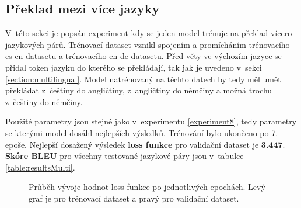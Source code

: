 \subsection{Překlad mezi více jazyky} \label{experimentMultiLingual}
V~této sekci je popsán experiment kdy se jeden model trénuje na překlad vícero jazykových párů. Trénovací dataset vznikl spojením a promícháním trénovacího cs-en datasetu a trénovacího en-de datasetu. Před věty ve výchozím jazyce se přidal token jazyku do kterého se překládají, tak jak je uvedeno v~sekci \ref{section:multilingual}. Model natrénovaný na těchto datech by tedy měl umět překládat z~češtiny do angličtiny, z~angličtiny do němčiny a možná trochu z~češtiny do němčiny.

Použité parametry jsou stejné jako v~experimentu \ref{experiment8}, tedy parametry se kterými model dosáhl nejlepších výsledků. Trénování bylo ukončeno po 7. epoše. Nejlepší dosažený výsledek \textbf{loss funkce} pro validační dataset je \textbf{3.447}. \textbf{Skóre BLEU} pro všechny testované jazykové páry jsou v~tabulce \ref{table:resultsMulti}.

\begin{figure}[H]
    \begin{center}
    \end{center}
	\caption{Průběh vývoje hodnot loss funkce po jednotlivých epochách. Levý graf je pro trénovací dataset a pravý pro validační dataset.}
\end{figure}

